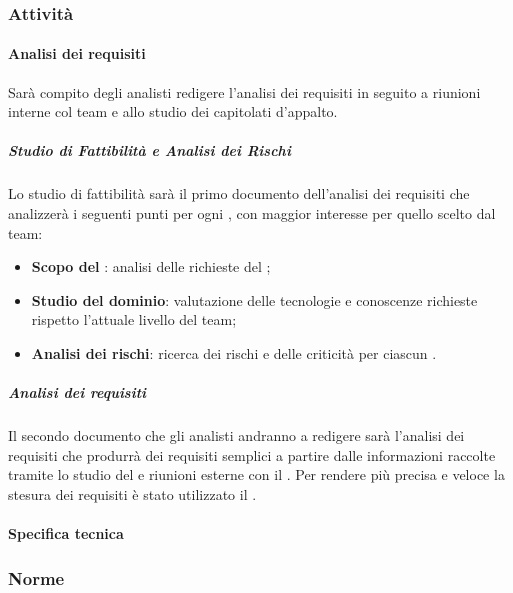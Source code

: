 \subsubsection{Attività}
\label{sec:2.1.1}
		\paragraph{Analisi dei requisiti}
		\label{sec:2.1.1.1}
			Sarà compito degli analisti redigere l'analisi dei requisiti in seguito a riunioni interne col team e allo studio dei capitolati d'appalto.
			\subparagraph{Studio di Fattibilità e Analisi dei Rischi}
			\label{sec:2.1.1.1.1}
				Lo studio di fattibilità sarà il primo documento dell'analisi dei requisiti che analizzerà i seguenti punti per ogni , con maggior interesse per quello scelto dal team:
				\begin{itemize}
					\item \textbf{Scopo del }: analisi delle richieste del ;
					\item \textbf{Studio del dominio}: valutazione delle tecnologie e conoscenze richieste rispetto l'attuale livello del team;
					\item \textbf{Analisi dei rischi}: ricerca dei rischi e delle criticità per ciascun .
				\end{itemize}
			\subparagraph{Analisi dei requisiti}
			\label{sec:2.1.1.1.2}
				Il secondo documento che gli analisti andranno a redigere sarà l'analisi dei requisiti che produrrà dei requisiti semplici a partire dalle informazioni raccolte tramite lo studio del  e riunioni esterne con il .
				Per rendere più precisa e veloce la stesura dei requisiti è stato utilizzato il  .
		\paragraph{Specifica tecnica}
		\label{sec:2.1.1.2}
		
\subsubsection{Norme}
\label{sec:2.1.2}
